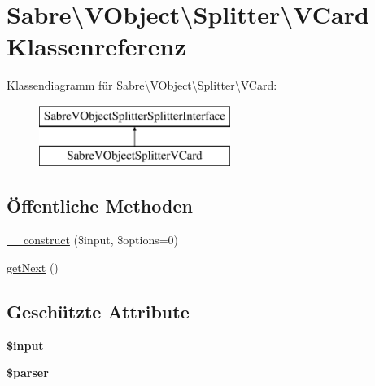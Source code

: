 \hypertarget{class_sabre_1_1_v_object_1_1_splitter_1_1_v_card}{}\section{Sabre\textbackslash{}V\+Object\textbackslash{}Splitter\textbackslash{}V\+Card Klassenreferenz}
\label{class_sabre_1_1_v_object_1_1_splitter_1_1_v_card}
Klassendiagramm für Sabre\textbackslash{}V\+Object\textbackslash{}Splitter\textbackslash{}V\+Card\+:\begin{figure}[H]
\begin{center}
\leavevmode
\includegraphics[height=2.000000cm]{class_sabre_1_1_v_object_1_1_splitter_1_1_v_card}
\end{center}
\end{figure}
\subsection*{Öffentliche Methoden}
\begin{DoxyCompactItemize}
\item 
\mbox{\hyperlink{class_sabre_1_1_v_object_1_1_splitter_1_1_v_card_a1cff6b026f7995b3cc3dc8516bf7a24c}{\+\_\+\+\_\+construct}} (\$input, \$options=0)
\item 
\mbox{\hyperlink{class_sabre_1_1_v_object_1_1_splitter_1_1_v_card_a0578fdb7544daa2e55d289168eb72292}{get\+Next}} ()
\end{DoxyCompactItemize}
\subsection*{Geschützte Attribute}
\begin{DoxyCompactItemize}
\item 
\mbox{\label{class_sabre_1_1_v_object_1_1_splitter_1_1_v_card_a07e1b56935db84d4d0fd762e0ae5410d}} 
{\bfseries \$input}
\item 
\mbox{\label{class_sabre_1_1_v_object_1_1_splitter_1_1_v_card_a5cfe8584208c025871c5c9d9370804b8}} 
{\bfseries \$parser}
\end{DoxyCompactItemize}


